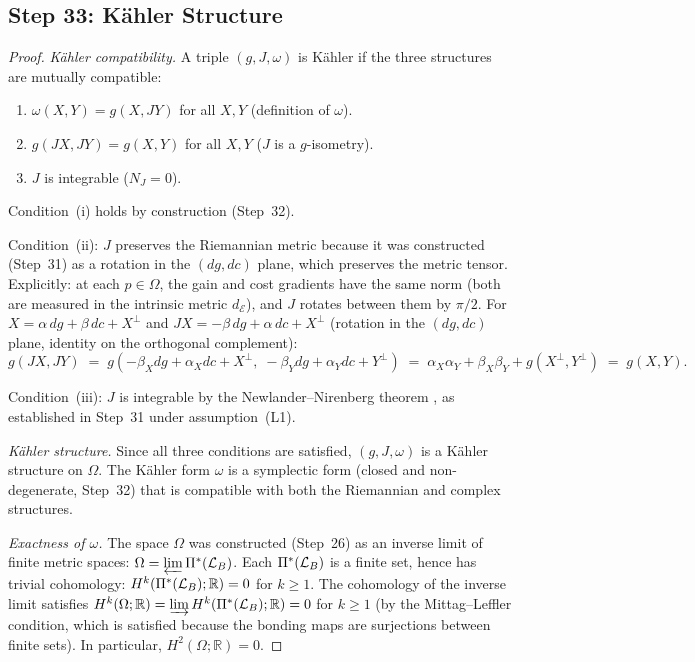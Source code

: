 
\subsection{Step 33: K\"{a}hler Structure}\label{app:step33}

\begin{proof}
\emph{K\"{a}hler compatibility.}  A triple $(g, J, \omega)$ is K\"{a}hler
if the three structures are mutually compatible:
\begin{enumerate}[nosep, label=(\roman*)]
  \item $\omega(X, Y) = g(X, JY)$ for all $X, Y$ (definition of $\omega$).
  \item $g(JX, JY) = g(X, Y)$ for all $X, Y$ ($J$ is a $g$-isometry).
  \item $J$ is integrable ($N_J = 0$).
\end{enumerate}

Condition~(i) holds by construction (Step~32).

Condition~(ii): $J$ preserves the Riemannian metric because it was
constructed (Step~31) as a rotation in the $(dg, dc)$ plane, which
preserves the metric tensor.  Explicitly: at each $p \in \Omega$, the
gain and cost gradients have the same norm (both are measured in the
intrinsic metric $d_{\mathcal{E}}$), and $J$ rotates between them by
$\pi/2$.  For $X = \alpha \, dg + \beta \, dc + X^\perp$ and
$JX = -\beta \, dg + \alpha \, dc + X^\perp$ (rotation in the
$(dg, dc)$ plane, identity on the orthogonal complement):
\[
  g(JX, JY) \;=\; g(-\beta_X dg + \alpha_X dc + X^\perp,\;
    -\beta_Y dg + \alpha_Y dc + Y^\perp)
  \;=\; \alpha_X \alpha_Y + \beta_X \beta_Y + g(X^\perp, Y^\perp)
  \;=\; g(X, Y).
\]

Condition~(iii): $J$ is integrable by the Newlander--Nirenberg theorem
\citep{newlander1957}, as established in Step~31 under assumption~(L1).

\emph{K\"{a}hler structure.}  Since all three conditions are satisfied,
$(g, J, \omega)$ is a K\"{a}hler structure on $\Omega$.  The K\"{a}hler
form $\omega$ is a symplectic form (closed and non-degenerate, Step~32)
that is compatible with both the Riemannian and complex structures.

\emph{Exactness of $\omega$.}  The space $\Omega$ was constructed
(Step~26) as an inverse limit of finite metric spaces:
$\Omega = \varprojlim \Pi^*(\mathcal{L}_B)$.  Each $\Pi^*(\mathcal{L}_B)$ is a
finite set, hence has trivial cohomology: $H^k(\Pi^*(\mathcal{L}_B); \mathbb{R})
= 0$ for $k \geq 1$.  The cohomology of the inverse limit satisfies
$H^k(\Omega; \mathbb{R}) = \varinjlim H^k(\Pi^*(\mathcal{L}_B); \mathbb{R}) = 0$
for $k \geq 1$ (by the Mittag--Leffler condition, which is satisfied
because the bonding maps are surjections between finite sets).
In particular, $H^2(\Omega; \mathbb{R}) = 0$.


\end{proof}

